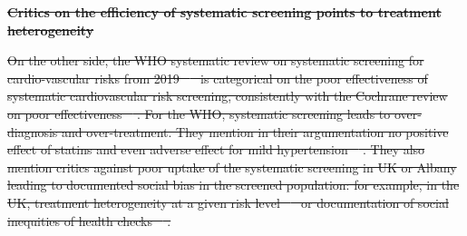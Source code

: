 \documentclass[10pt,letterpaper]{article}
\providecommand{\DIFdeltex}[1]{{\protect\color{red}\sout{#1}}}                      %
\providecommand{\DIFdelbegin}{} %
\providecommand{\DIFdelend}{} %
\providecommand{\DIFdel}[1]{\texorpdfstring{\DIFdeltex{#1}}{}} %
\newcommand{\DIFscaledelfig}{0.5}
\newlength{\DIFdelgraphicswidth} %
\newlength{\DIFdelgraphicsheight} %
\newcommand{\DIFdelincludegraphics}[2][]{%
\sbox{\DIFdelgraphicsbox}{\DIFOincludegraphics[#1]{#2}}%
\settoboxwidth{\DIFdelgraphicswidth}{\DIFdelgraphicsbox} %
\settoboxtotalheight{\DIFdelgraphicsheight}{\DIFdelgraphicsbox} %
\scalebox{\DIFscaledelfig}{%
\parbox[b]{\DIFdelgraphicswidth}{\usebox{\DIFdelgraphicsbox}\\[-\baselineskip] \rule{\DIFdelgraphicswidth}{0em}}\llap{\resizebox{\DIFdelgraphicswidth}{\DIFdelgraphicsheight}{%
\setlength{\unitlength}{\DIFdelgraphicswidth}%
\begin{picture}(1,1)%
\thicklines\linethickness{2pt} %
{\color[rgb]{1,0,0}\put(0,0){\framebox(1,1){}}}%
{\color[rgb]{1,0,0}\put(0,0){\line( 1,1){1}}}%
{\color[rgb]{1,0,0}\put(0,1){\line(1,-1){1}}}%
\end{picture}%
}\hspace*{3pt}}} %
} %
\DeclareRobustCommand{\DIFdelbegin}{\DIFOdelbegin \let\includegraphics\DIFdelincludegraphics} %
\DeclareRobustCommand{\DIFdelend}{\DIFOaddend \let\includegraphics\DIFOincludegraphics} %
\begin{document}
\DIFdelbegin \textbf{\DIFdel{Critics on the efficiency of systematic screening points to treatment heterogeneity}}
\DIFdelend %

\DIFdelbegin \DIFdel{On the other side, the WHO systematic review on systematic screening for
cardio-vascular risks from 2019 \mbox{%
\cite{eriksen2021effectiveness} }\hskip0pt%
is
categorical on the poor effectiveness of systematic cardiovascular risk
screening, consistently with the Cochrane review on poor effectiveness
\mbox{%
\cite{krogsboll2012general}}\hskip0pt%
. For the WHO, systematic screening leads to
over-diagnosis and over-treatment. They mention in their argumentation no
positive effect of statins and even adverse effect for mild hypertension
\mbox{%
\cite{diao2012pharmacotherapy}}\hskip0pt%
. They also mention critics against poor
uptake of the systematic screening in UK or Albany leading to documented
social bias in the screened population: for example, in the UK, treatment
heterogeneity at a given risk level \mbox{%
\cite{van2013efficiency} }\hskip0pt%
or documentation
of social inequities of health checks \mbox{%
\cite{krska2016implementation}}\hskip0pt%
.
}\DIFdelend %
\end{document}
